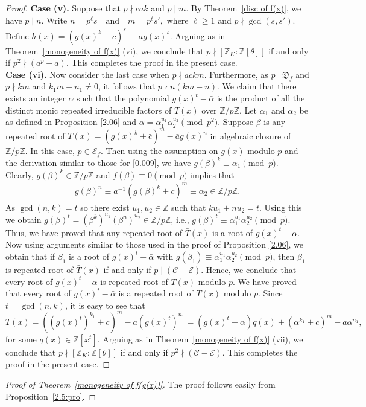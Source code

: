 \documentclass[table]{amsart}
\newcommand{\scrE}{\mathscr{E}}
\newcommand{\Z}{\mathbb{Z}}
\newcommand{\D}{\mathfrak{D}}
\newcommand{\calC}{\mathcal{C}}
\newcommand{\calE}{\mathcal{E}}
\numberwithin{equation}{section}
\begin{document}
\begin{proof}
\textbf{Case (v).} Suppose that $p\nmid cak$ and $p\mid m$.
By Theorem~\ref{disc of f(x)}, we have $p\mid n$.
Write $n=p^{\ell}s \quad \text{and} \quad m=p^{\ell}s',$ where $\ell\ge1$ and $p\nmid \gcd(s,s')$.
Define $h(x)=(g(x)^{k}+c)^{s'}-a g(x)^{s}.$ Arguing as in Theorem~\ref{monogeneity of f(x)} \textup{(vi)}, we conclude that
$p\nmid[\mathbb{Z}_{K}:\mathbb{Z}[\theta]]$ if and only if
$p^{2}\nmid (a^{p}-a)$.
This completes the proof in the present case.
\\[2mm]
\textbf{Case (vi).} Now consider the last  case when $p \nmid ackm $. Furthermore, as $p\mid \D_f$ and $p\nmid km$ and $k_1m-n_1 \neq 0$, it follows that $p \nmid n(km-n)$. We claim that there exists an integer $\alpha$ such that the polynomial $g(x)^t - \bar{\alpha}$ is the product of all the distinct monic repeated irreducible factors of $\overline{T}(x)$ over $\Z/p\Z$. 
Let $\alpha_1$ and $\alpha_2$ be as defined in Proposition \ref{2.06} and $\alpha = \alpha_1^{u_1} \alpha_2^{u_2} \pmod{p^2}$. Suppose $\beta$ is any repeated root of $\bar T (x)= (g(x)^k+\bar c)^m -\bar a g(x)^n$ in algebraic closure of $\Z/p\Z.$ In this case, $p \in \scrE_f$. Then using the assumption on $g(x)$ modulo $p$ and the derivation similar to those for \eqref{0.009}, we have $g(\beta)^k \equiv \alpha_1 \pmod{p}$. Clearly, $g(\beta)^k \in \Z/p\Z$ and $f(\beta)\equiv 0 \pmod{p}$ implies that
	\begin{align*}
		g(\beta)^n \equiv a^{-1} (g(\beta)^k +c)^m \equiv \alpha_{2} \in {\Z/p\Z}.
	\end{align*}
As ${\gcd(n,k)}=t$ so there exist $u_1,u_2\in\Z$ such that $ku_1+nu_2=t.$ Using this we obtain $g(\beta)^t = (\beta^k)^{u_1}(\beta^n)^{u_2} \in {\Z/p\Z}$, i.e., $g(\beta)^t \equiv \alpha_1^{u_1} \alpha_{2}^{u_2}\pmod{p}$. Thus, we have proved that any repeated root of $\bar T(x)$ is a root of $ g(x)^t-\bar{\alpha}$. Now using arguments similar to those used in the proof of Proposition \ref{2.06}, we obtain that if $\beta_1$ is a root of $g(x)^t-\bar{\alpha}$  with {$g(\beta_1) \equiv \alpha_1^{u_1} \alpha_{2}^{u_2} \pmod{p}$}, then $\beta_1$ is repeated root of $\bar{T}(x)$ if and only if $p\mid (\calC - \calE)$. Hence, we conclude that every root of $g(x)^t-\bar{\alpha}$ is repeated root of $T(x)$ modulo $p$. We have proved that every root of $g(x)^t - \bar{\alpha}$ is a repeated root of $T(x)$ modulo $p$. Since $t=\gcd(n,k)$, it is easy to see that
	\begin{equation}\label{3.20b}
		T(x)= ((g(x)^t)^{k_1}+c)^m -a(g(x)^t)^{n_1} = (g(x)^t-\alpha)q(x) +  (\alpha^{k_1}+c)^m - a \alpha^{n_1},
	\end{equation}
	for some $q(x) \in \Z[x^t]$.  Arguing as in Theorem~\ref{monogeneity of f(x)} \textup{(vii)}, we conclude that
$p\nmid[\mathbb{Z}_{K}:\mathbb{Z}[\theta]]$ if and only if
$p^{2}\nmid (\calC-\calE)$.
This completes the proof in the present case.
\end{proof}
\begin{proof}[Proof of Theorem~\ref{monogeneity of f(g(x))}]
  The proof follows easily from Proposition~\ref{2.5:pro}.
\end{proof}
\end{document}
